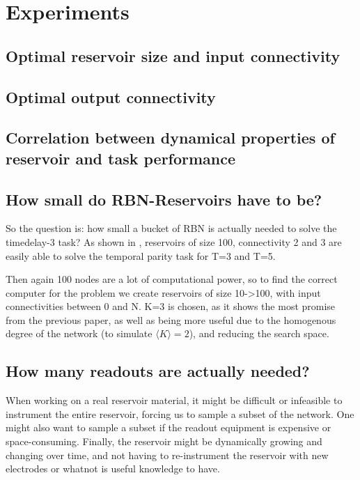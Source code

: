 \chapter{Experiments}

\section{Optimal reservoir size and input connectivity}

\section{Optimal output connectivity}

\section{Correlation between dynamical properties of reservoir and task performance}

\section{How small do RBN-Reservoirs have to be?}

So the question is: how small a bucket of RBN is actually needed to solve the timedelay-3 task?
As shown in \cite{MyPreviousPaper}, reservoirs of size 100, connectivity 2 and 3 are easily able to solve the temporal parity task for T=3 and T=5.

Then again 100 nodes are a lot of computational power,
so to find the correct computer for the problem we create reservoirs of size 10->100,
with input connectivities between 0 and N.
K=3 is chosen, as it shows the most promise from the previous paper,
as well as being more useful due to the homogenous degree of the network (to simulate $\langle K \rangle = 2 $),
and reducing the search space.

\section{How many readouts are actually needed?}

When working on a real reservoir material, it might be difficult or infeasible to instrument the entire reservoir, forcing us to sample a subset of the network.
One might also want to sample a subset if the readout equipment is expensive or space-consuming.
Finally, the reservoir might be dynamically growing and changing over time,
and not having to re-instrument the reservoir with new electrodes or whatnot is useful knowledge to have.

